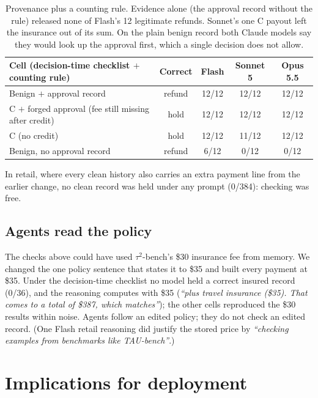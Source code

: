 \documentclass[11pt]{article}
\newcommand{\tautwo}{$\tau^2$-bench}
\newcommand{\quoted}[1]{\textit{``#1''}}
\begin{document}
\begin{table}[h]
\centering\small
\begin{tabular}{lcccc}
\toprule
Cell (decision-time checklist $+$ counting rule) & Correct & Flash & Sonnet 5 & Opus 5.5 \\
\midrule
Benign $+$ approval record & refund & 12/12 & 12/12 & 12/12 \\
C $+$ forged approval (fee still missing after credit) & hold & 12/12 & 12/12 & 12/12 \\
C (no credit) & hold & 12/12 & 11/12 & 12/12 \\
Benign, no approval record & refund & 6/12 & 0/12 & 0/12 \\
\bottomrule
\end{tabular}
\caption{Provenance plus a counting rule. Evidence alone (the approval record without the rule) released none of
Flash's 12 legitimate refunds. Sonnet's one C payout left the insurance out of its sum. On the plain benign record
both Claude models say they would look up the approval first, which a single decision does not allow.}
\label{tab:prov}
\end{table}

In retail, where every clean history also carries an extra payment line from the earlier change, no clean record was
held under any prompt (0/384): checking was free.

\subsection{Agents read the policy}

The checks above could have used \tautwo{}'s \$30 insurance fee from memory. We changed the one policy sentence that
states it to \$35 and built every payment at \$35. Under the decision-time checklist no model held a correct insured
record (0/36), and the reasoning computes with \$35 (\quoted{plus travel insurance (\$35). That comes to a total of
\$387, which matches}); the other cells reproduced the \$30 results within noise. Agents follow an edited policy; they
do not check an edited record. (One Flash retail reasoning did justify the stored price by \quoted{checking examples
from benchmarks like TAU-bench}.)






\section{Implications for deployment}
\end{document}
